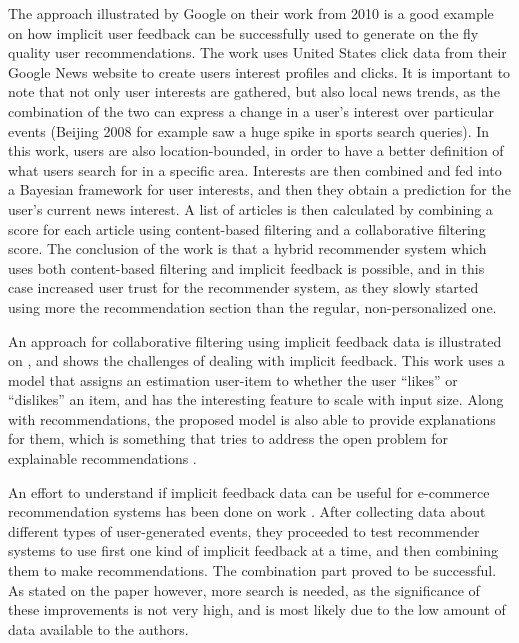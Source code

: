 \documentclass[sigconf,nonacm]{acmart}
\begin{document}
The approach illustrated by Google on their work from 2010 \cite{liu2010personalized}
is a good example on how implicit user feedback can be successfully used to generate
on the fly quality user recommendations. The work uses United States
click data from their Google News website to create users interest profiles and
clicks. It is important to note that not only user interests are gathered,
but also local news trends, as the combination of the two can express a change in
a user's interest over particular events (Beijing 2008 for example saw a huge spike
in sports search queries). In this work, users are also location-bounded, in order
to have a better definition of what users search for in a specific area.
Interests are then combined and fed into a Bayesian framework
\cite{nielsen2009bayesian, rendle2012bpr}
for user interests, and then they obtain a prediction for the user's current
news interest. A list of articles is then calculated by combining
a score for each article using content-based filtering \cite{van2000using}
and a collaborative filtering score. The conclusion of the work is that a hybrid
recommender system which uses both content-based filtering and implicit feedback
is possible, and in this case increased user trust for the recommender system,
as they slowly started using more the recommendation section than the regular,
non-personalized one.

An approach for collaborative filtering using implicit feedback data is illustrated
on \cite{hu2008collaborative}, and shows the challenges of dealing with implicit
feedback. This work uses a model that assigns an estimation user-item to whether
the user ``likes'' or ``dislikes'' an item, and has the interesting feature to
scale with input size. Along with recommendations, the proposed model is also
able to provide explanations for them, which is something that tries to address the
open problem for explainable recommendations \cite{zhang2014explicit,
  zhang2018explainable}.

An effort to understand if implicit feedback data can be useful for e-commerce
recommendation systems has been done on work \cite{peska2012estimating}. After
collecting data about different types of user-generated events, they proceeded
to test recommender systems to use first one kind of implicit feedback at a
time, and then combining them to make recommendations. The combination part
proved to be successful. As stated on the paper however, more search is needed,
as the significance of these improvements is not very high, and is most likely
due to the low amount of data available to the authors.
\end{document}
